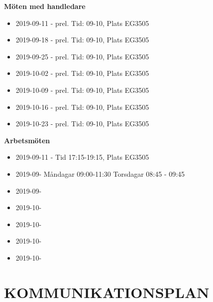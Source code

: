 \documentclass[a4paper]{article}
\begin{document}
\textbf{Möten med handledare}
\begin{itemize}
	\item 2019-09-11 - prel. Tid: 09-10, Plats EG3505
	\item 2019-09-18 - prel. Tid: 09-10, Plats EG3505
	\item 2019-09-25 - prel. Tid: 09-10, Plats EG3505
	\item 2019-10-02 - prel. Tid: 09-10, Plats EG3505
	\item 2019-10-09 - prel. Tid: 09-10, Plats EG3505
	\item 2019-10-16 - prel. Tid: 09-10, Plats EG3505
	\item 2019-10-23 - prel. Tid: 09-10, Plats EG3505

\end{itemize}
\noindent
\textbf{Arbetsmöten}
\begin{itemize}
	\item 2019-09-11 - Tid 17:15-19:15, Plats EG3505
	\item 2019-09-  Måndagar 09:00-11:30 Torsdagar 08:45 - 09:45
	\item 2019-09-
	\item 2019-10-
	\item 2019-10-
	\item 2019-10-
	\item 2019-10-

\end{itemize}


\section{KOMMUNIKATIONSPLAN}
\label{sec:komm}
\end{document}
